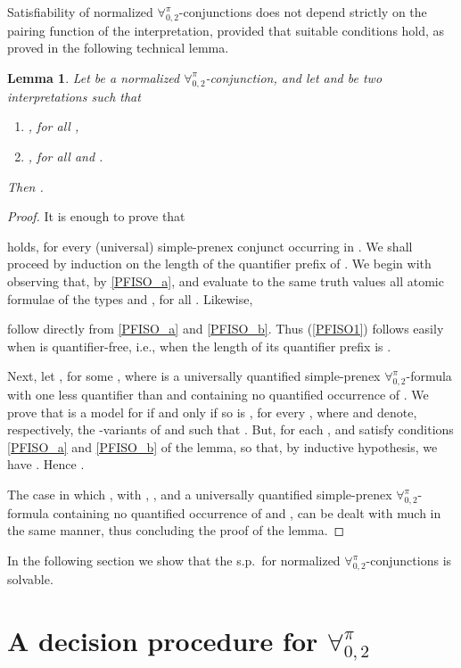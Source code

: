 \documentclass[submission,copyright,creativecommons]{eptcs}
\newtheorem{lemma}{Lemma}
\newcommand{\Lang}{\ensuremath{\mathbf{\forall}^{\pi}_{0,2}}\xspace}
\begin{document}
Satisfiability of normalized \Lang-conjunctions does not depend
strictly on the pairing function of the interpretation, provided that
suitable conditions hold, as proved in the following technical lemma.

\begin{lemma}\label{PFISO}
Let  be a normalized \Lang-conjunction, and let  and
 be two interpretations such that
\begin{enumerate}[label=(\alph*)]
 \item\label{PFISO_a} , for all ,

 \item\label{PFISO_b} , for all  and .
\end{enumerate}
Then .
\end{lemma}
\begin{proof}
It is enough to prove that

holds, for every (universal) simple-prenex conjunct  occurring
in .  We shall proceed by induction on the length of the
quantifier prefix of .  We begin with observing that, by
\ref{PFISO_a},  and  evaluate to the same truth
values all atomic formulae of the types  and
, for all .  Likewise,

follow directly from \ref{PFISO_a} and \ref{PFISO_b}.  Thus
(\ref{PFISO1}) follows easily when  is quantifier-free, i.e., 
when the length of its quantifier prefix is .

Next, let , for some , where  is a universally quantified
simple-prenex \Lang-formula with one less quantifier than  and
containing no quantified occurrence of .  We prove that
 is a model for  if and only if so is
, for every , where
 and  denote, respectively, the -variants of
 and  such that .  But, for each ,
 and  satisfy conditions \ref{PFISO_a} and
\ref{PFISO_b} of the lemma, so that, by inductive hypothesis, we have
.  Hence
.

The case in which , with
, , and  a
universally quantified simple-prenex \Lang-formula containing no
quantified occurrence of  and , can be dealt with much in
the same manner, thus concluding the proof of the lemma.
\end{proof}

In the following section we show that the s.p.\ for normalized
\Lang-conjunctions is solvable. 

\section{A decision procedure for \Lang}\label{DECPROC}
\end{document}
